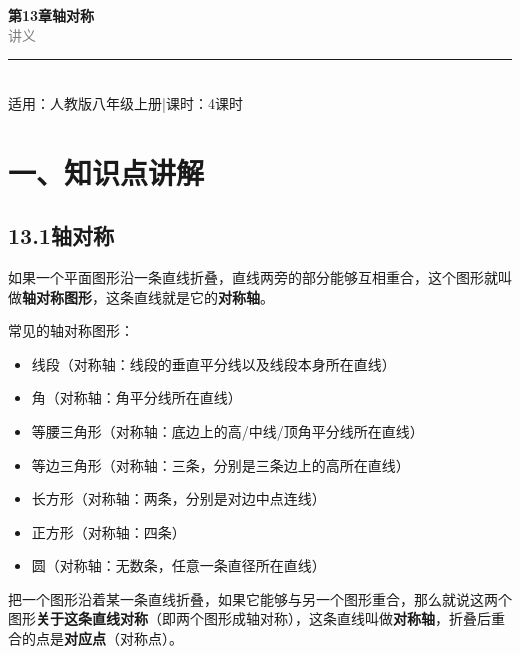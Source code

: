 \documentclass[12pt, a4paper]{ctexart}
\begin{document}
\begin{center}
{\Huge\bfseries\textcolor{mainblue}{第13章\quad 轴对称}}\\[12pt]
{\Large\textcolor{gray}{讲\quad 义}}\\[8pt]
\rule{0.6\textwidth}{1pt}\\[8pt]
{\normalsize 适用：人教版\quad 八年级上册\quad |\quad 课时：4课时}
\end{center}
\vspace{10pt}

\section*{\textcolor{mainblue}{一、知识点讲解}}

\subsection*{13.1\quad 轴对称}

\begin{knowledgebox}[轴对称图形]
如果一个平面图形沿一条直线折叠，直线两旁的部分能够互相重合，这个图形就叫做\textbf{轴对称图形}，这条直线就是它的\textbf{对称轴}。

常见的轴对称图形：
\begin{itemize}[nosep]
  \item 线段（对称轴：线段的垂直平分线以及线段本身所在直线）
  \item 角（对称轴：角平分线所在直线）
  \item 等腰三角形（对称轴：底边上的高/中线/顶角平分线所在直线）
  \item 等边三角形（对称轴：三条，分别是三条边上的高所在直线）
  \item 长方形（对称轴：两条，分别是对边中点连线）
  \item 正方形（对称轴：四条）
  \item 圆（对称轴：无数条，任意一条直径所在直线）
\end{itemize}
\end{knowledgebox}

\begin{knowledgebox}[两个图形成轴对称]
把一个图形沿着某一条直线折叠，如果它能够与另一个图形重合，那么就说这两个图形\textbf{关于这条直线对称}（即两个图形成轴对称），这条直线叫做\textbf{对称轴}，折叠后重合的点是\textbf{对应点}（对称点）。
\end{knowledgebox}
\end{document}
